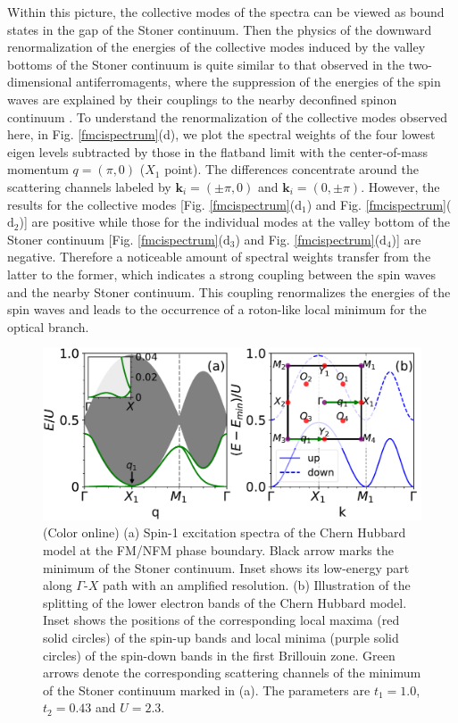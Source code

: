 \documentclass[amsmath,superscriptaddress,showpacs,aps,prb,twocolumn]{revtex4-1}
\begin{document}
\par Within this picture, the collective modes of the spectra can be viewed as bound states in the gap of the Stoner continuum. Then the physics of the downward renormalization of the energies of the collective modes induced by the valley bottoms of the Stoner continuum is quite similar to that observed in the two-dimensional antiferromagents, where the suppression of the energies of the spin waves are explained by their couplings to the nearby deconfined spinon continuum \cite{ZFSMC_PRL2006,TS_PRL2013,DMCNTPEMIR_NP2015,YWDYL_arXiv2018}. To understand the renormalization of the collective modes observed here, in Fig. \ref{fmcispectrum}(d), we plot the spectral weights of the four lowest eigen levels subtracted by those in the flatband limit with the center-of-mass momentum $q=(\pi,0)$ ($X_1$ point). The differences concentrate around the scattering channels labeled by $\mathbf{k}_i=(\pm\pi,0)$ and $\mathbf{k}_i=(0,\pm\pi)$. However, the results for the collective modes [Fig. \ref{fmcispectrum}($\text{d}_1$) and Fig. \ref{fmcispectrum}($\text{d}_2$)] are positive while those for the individual modes at the valley bottom of the Stoner continuum [Fig. \ref{fmcispectrum}($\text{d}_3$) and Fig. \ref{fmcispectrum}($\text{d}_4$)] are negative. Therefore a noticeable amount of spectral weights transfer from the latter to the former, which indicates a strong coupling between the spin waves and the nearby Stoner continuum. This coupling renormalizes the energies of the spin waves and leads to the occurrence of a roton-like local minimum for the optical branch.

\begin{figure}
\includegraphics[width=\columnwidth]{pbcispectrum}
\caption{(Color online) (a) Spin-1 excitation spectra of the Chern Hubbard model at the FM/NFM phase boundary. Black arrow marks the minimum of the Stoner continuum. Inset shows its low-energy part along $\Gamma$-$X$ path with an amplified resolution. (b) Illustration of the splitting of the lower electron bands of the Chern Hubbard model. Inset shows the positions of the corresponding local maxima (red solid circles) of the spin-up bands and local minima (purple solid circles) of the spin-down bands in the first Brillouin zone. Green arrows denote the corresponding scattering channels of the minimum of the Stoner continuum marked in (a). The parameters are $t_1=1.0$, $t_2=0.43$ and $U=2.3$.}
\label{pbcispectrum}
\end{figure}
\end{document}
